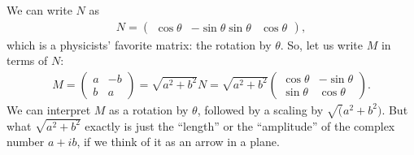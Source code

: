 \documentclass{article}
\theoremstyle{definition}
\begin{document}
We can write $N$ as
\begin{align*}
N = \begin{pmatrix}
\cos\theta & -\sin\theta
\sin\theta & \cos\theta
\end{pmatrix},
\end{align*}
which is a physicists' favorite matrix: the rotation by $\theta$. So, let us write $M$ in terms of $N$:
\begin{align*}
M = \begin{pmatrix}
a & -b\\
b & a
\end{pmatrix} = \sqrt{a^2 + b^2}N = \sqrt{a^2 + b^2}\begin{pmatrix}
\cos\theta & -\sin\theta\\
\sin\theta & \cos\theta
\end{pmatrix}.
\end{align*}
We can interpret $M$ as a rotation by $\theta$, followed by a scaling by $\sqrt(a^2 + b^2)$. But what $\sqrt{a^2 + b^2}$ exactly is just the ``length'' or the ``amplitude'' of the complex number $a+ib$, if we think of it as an arrow in a plane. 
\end{document}
